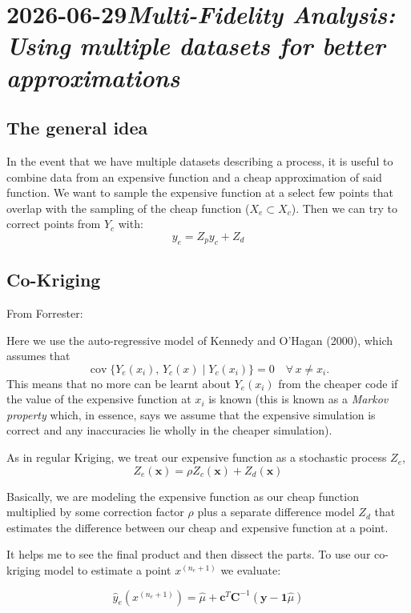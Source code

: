 \documentclass[11pt]{article}
\newcommand{\entry}[2]{\clearpage\section[#2]{#1\quad\textnormal{\textit{#2}}}}
\newcommand{\subentry}[1]{\subsection{#1}}
\theoremstyle{definition}
\begin{document}
\entry{2026-06-29}{Multi-Fidelity Analysis: Using multiple datasets for better approximations}
\subentry{The general idea}
In the event that we have multiple datasets describing a process,
it is useful to combine data from an expensive function and a cheap approximation of 
said function. We want to sample the expensive function at a select few points that overlap with
the sampling of the cheap function ($X_e \subset X_c$). Then we can try to correct points from $Y_c$
with:
\begin{equation}
  y_e = Z_py_c + Z_d
  \label{eq:multi-fidelity}
\end{equation}

\subentry{Co-Kriging}
From Forrester:
\begin{displayquote}[Forrester et al., 2008]
  Here we use the auto-regressive model of Kennedy and O'Hagan (2000), which
  assumes that
  \begin{equation*}
    \operatorname{cov}\{Y_e(x_i),\, Y_c(x) \mid Y_c(x_i)\} = 0
    \quad \forall\, x \neq x_i.
  \end{equation*}
  This means that no more can be learnt about $Y_e(x_i)$ from the cheaper code if
  the value of the expensive function at $x_i$ is known (this is known as a
  \emph{Markov property} which, in essence, says we assume that the expensive
  simulation is correct and any inaccuracies lie wholly in the cheaper
  simulation).
\end{displayquote}
As in regular Kriging, we treat our expensive function as a stochastic process $Z_e$,
\begin{equation}
  Z_e(\mathbf{x}) = \rho Z_c(\mathbf{x}) + Z_d(\mathbf{x})
  \label{eq:co-kriging}
\end{equation}

Basically, we are modeling the expensive function as our cheap function multiplied by some
correction factor $\rho$ plus a separate difference model $Z_d$ that estimates the difference
between our cheap and expensive function at a point.

It helps me to see the final product and then dissect the parts. To use our co-kriging model to estimate
a point $x^{(n_e + 1)}$ we evaluate:

\begin{equation}
  \hat{y}_e\!\left(x^{(n_e+1)}\right)
    = \hat{\mu} + \mathbf{c}^T \mathbf{C}^{-1}\left(\mathbf{y} - \mathbf{1}\hat{\mu}\right)
  \label{eq:co-kriging-evaluate}
\end{equation}
\end{document}
